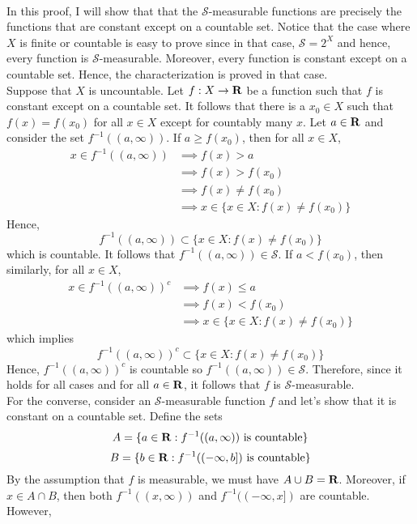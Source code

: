 \begin{solution}
    \\ In this proof, I will show that that the $\mathcal{S}$-measurable functions are precisely the functions that are constant except on a countable set. Notice that the case where $X$ is finite or countable is easy to prove since in that case, $\mathcal{S} = 2^X$ and hence, every function is $\mathcal{S}$-measurable. Moreover, every function is constant except on a countable set. Hence, the characterization is proved in that case. \\
    Suppose that $X$ is uncountable. Let $f : X \to \mathbf{R}$ be a function such that $f$ is constant except on a countable set. It follows that there is a $x_0 \in X$ such that $f(x) = f(x_0)$ for all $x \in X$ except for countably many $x$. Let $a \in \mathbf{R}$ and consider the set $f^{-1}((a, \infty))$. If $a \geq f(x_0)$, then for all $x \in X$,
    \begin{align*}
        x \in f^{-1}((a, \infty)) &\implies f(x) > a \\
        &\implies f(x) > f(x_0) \\
        &\implies f(x) \neq f(x_0) \\
        &\implies x \in \{x \in X : f(x) \neq f(x_0)\}
    \end{align*}
    Hence, 
    $$f^{-1}((a, \infty)) \subset \{x \in X : f(x) \neq f(x_0)\}$$
    which is countable. It follows that $f^{-1}((a, \infty)) \in \mathcal{S}$. If $a < f(x_0)$, then similarly, for all $x \in X$,
    \begin{align*}
        x \in f^{-1}((a, \infty))^c &\implies f(x) \leq a \\
        &\implies f(x) < f(x_0) \\
        &\implies x \in \{x \in X : f(x) \neq f(x_0)\}
    \end{align*}
    which implies
    $$f^{-1}((a, \infty))^c \subset \{x \in X : f(x) \neq f(x_0)\}$$
    Hence, $f^{-1}((a, \infty))^c$ is countable so $f^{-1}((a, \infty)) \in \mathcal{S}$. Therefore, since it holds for all cases and for all $a \in \mathbf{R}$, it follows that $f$ is $\mathcal{S}$-measurable. \\
    For the converse, consider an $\mathcal{S}$-measurable function $f$ and let's show that it is constant on a countable set. Define the sets
    $$A = \{a \in \mathbf{R} : f^{-1}((a, \infty)) \text{ is countable}\}$$
    $$B = \{b \in \mathbf{R} : f^{-1}((-\infty, b]) \text{ is countable}\}$$
    By the assumption that $f$ is measurable, we must have $A \cup B = \mathbf{R}$. Moreover, if $x \in A \cap B$, then both $f^{-1}((x, \infty))$ and $f^{-1}((-\infty, x])$ are countable. However,

\end{solution}
